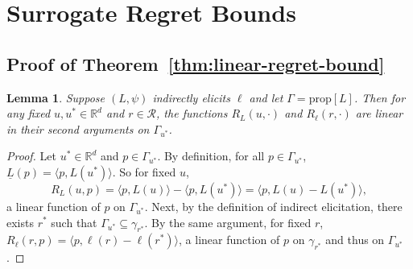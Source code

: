 \documentclass[11pt]{article}
\newcommand{\reals}{\mathbb{R}}
\newcommand{\prop}[1]{\mathrm{prop}[#1]}
\newcommand{\D}{\mathcal{D}}
\newcommand{\E}{\mathbb{E}}
\newcommand{\R}{\mathcal{R}}
\newcommand{\risk}[1]{\underline{#1}}
\newcommand{\inprod}[2]{\langle #1, #2 \rangle}%
\newcommand{\trim}{\mathrm{trim}}
\newtheorem{lemma}{Lemma}
\newtheorem{observation}{Observation}
\begin{document}



\section{Surrogate Regret Bounds} \label{app:regret-bounds}

\subsection{Proof of Theorem~\ref{thm:linear-regret-bound}}

\begin{lemma}\label{lem:linear-on-levelset}
  Suppose $(L,\psi)$ indirectly elicits $\ell$ and let $\Gamma = \prop{L}$.
  Then for any fixed $u,u^* \in \reals^d$ and $r \in \R$, the functions $R_L(u,\cdot)$ and $R_{\ell}(r,\cdot)$ are linear in their second arguments on $\Gamma_{u^*}$.
\end{lemma}
\begin{proof}
  Let $u^* \in \reals^d$ and $p \in \Gamma_{u^*}$.
  By definition, for all $p \in \Gamma_{u^*}$, $\risk{L}(p) = \inprod{p}{L(u^*)}$.
  So for fixed $u$,
    \[ R_L(u,p) = \inprod{p}{L(u)} - \inprod{p}{L(u^*)} = \inprod{p}{L(u) - L(u^*)} , \]
  a linear function of $p$ on $\Gamma_{u^*}$.
  Next, by the definition of indirect elicitation, there exists $r^*$ such that $\Gamma_{u^*} \subseteq \gamma_{r^*}$.
  By the same argument, for fixed $r$, $R_{\ell}(r,p) = \inprod{p}{\ell(r) - \ell(r^*)}$, a linear function of $p$ on $\gamma_{r^*}$ and thus on $\Gamma_{u^*}$.
\end{proof}
\end{document}

